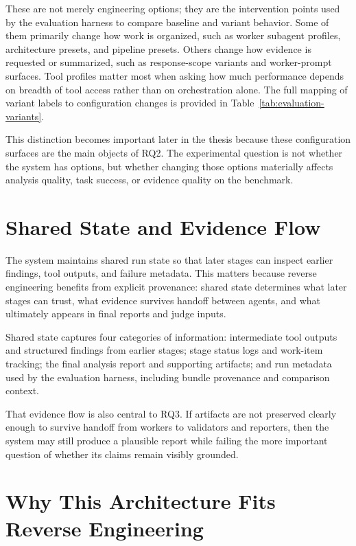 These are not merely engineering options; they are the intervention points used by the evaluation harness to compare baseline and variant behavior. Some of them primarily change how work is organized, such as worker subagent profiles, architecture presets, and pipeline presets. Others change how evidence is requested or summarized, such as response-scope variants and worker-prompt surfaces. Tool profiles matter most when asking how much performance depends on breadth of tool access rather than on orchestration alone. The full mapping of variant labels to configuration changes is provided in Table~\ref{tab:evaluation-variants}.

This distinction becomes important later in the thesis because these configuration surfaces are the main objects of RQ2. The experimental question is not whether the system has options, but whether changing those options materially affects analysis quality, task success, or evidence quality on the benchmark.

\section{Shared State and Evidence Flow}

The system maintains shared run state so that later stages can inspect earlier findings, tool outputs, and failure metadata. This matters because reverse engineering benefits from explicit provenance: shared state determines what later stages can trust, what evidence survives handoff between agents, and what ultimately appears in final reports and judge inputs.

Shared state captures four categories of information: intermediate tool outputs and structured findings from earlier stages; stage status logs and work-item tracking; the final analysis report and supporting artifacts; and run metadata used by the evaluation harness, including bundle provenance and comparison context.

That evidence flow is also central to RQ3. If artifacts are not preserved clearly enough to survive handoff from workers to validators and reporters, then the system may still produce a plausible report while failing the more important question of whether its claims remain visibly grounded.

\section{Why This Architecture Fits Reverse Engineering}

